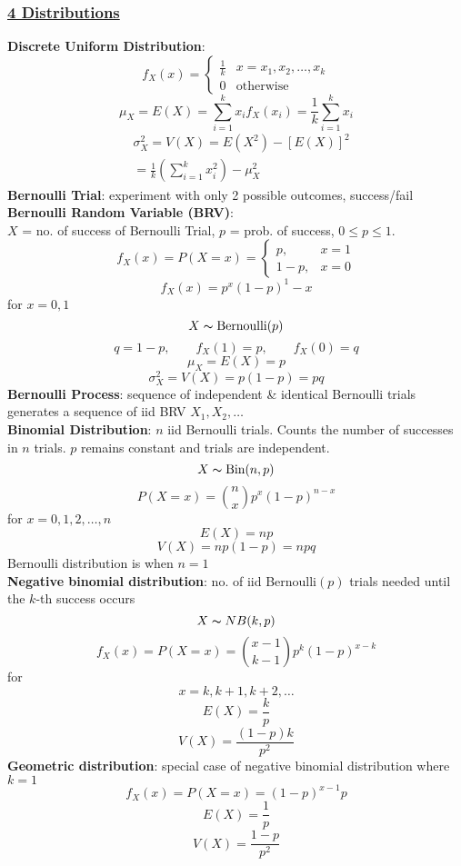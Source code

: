\documentclass{article}
\begin{document}
\begin{multicols*}{3}
\subsubsection*{\underline{4 Distributions}}
\textbf{Discrete Uniform Distribution}:\\
$$f_X(x)=\begin{cases}
    \frac{1}{k} & x=x_1,x_2,\dots,x_k\\
    0 & \text{otherwise}
\end{cases}$$ 
$$\mu_X=E(X)=\sum_{i=1}^kx_if_X(x_i)=\frac{1}{k}\sum_{i=1}^kx_i$$
\begin{align*}
&\sigma_X^2=V(X)=E(X^2)-[E(X)]^2\\
&=\frac{1}{k}(\sum_{i=1}^kx_i^2)-\mu_X^2
\end{align*}
\textbf{Bernoulli Trial}: experiment with only 2 possible outcomes, success/fail\\
\textbf{Bernoulli Random Variable (BRV)}: \\
$X$ = no. of success of Bernoulli Trial, $p$ = prob. of success, $0\leq p\leq 1$.\\
$$f_X(x)=P(X=x)=\begin{cases}
    p, & x=1 \\ 1-p, & x=0
\end{cases}$$
$$f_X(x)=p^x(1-p)^1-x$$ for $x=0,1$\\
$$X\thicksim \text{Bernoulli}(p)$$ 
$$q=1-p, \qquad f_X(1)=p, \qquad f_X(0)=q$$
$$\mu_X=E(X)=p$$ 
$$\sigma_X^2=V(X)=p(1-p)=pq$$
\textbf{Bernoulli Process}: sequence of independent \& identical Bernoulli trials generates a sequence of iid BRV $X_1,X_2,\dots$ \\
\textbf{Binomial Distribution}: $n$ iid Bernoulli trials. Counts the number of successes in $n$ trials. $p$ remains constant and trials are independent.\\
$$X\thicksim \text{Bin}(n,p)$$
$$P(X=x)={n\choose{x}}p^x(1-p)^{n-x}$$ for $x=0, 1,2,\dots,n$\\
$$E(X)=np$$
$$V(X)=np(1-p)=npq$$
Bernoulli distribution is when $n=1$\\
\textbf{Negative binomial distribution}: no. of iid Bernoulli$(p)$ trials needed until the $k$-th success occurs $$X\thicksim NB(k,p)$$
$$f_X(x)=P(X=x)= {x-1\choose{k-1}}p^k(1-p)^{x-k}$$ for $$x=k,k+1,k+2,\dots$$
$$E(X)=\frac{k}{p}$$
$$V(X)=\frac{(1-p)k}{p^2}$$
\textbf{Geometric distribution}: special case of negative binomial distribution where $k=1$\\ 
$$f_X(x)=P(X=x)=(1-p)^{x-1}p$$
$$E(X)=\frac{1}{p}$$
$$V(X)=\frac{1-p}{p^2}$$

\end{multicols*}
\end{document}
